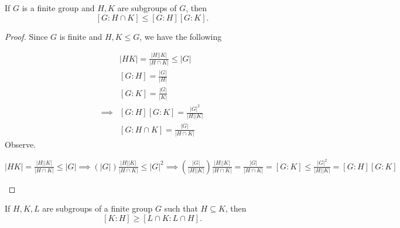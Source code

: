 \documentclass[addpoints,10pt]{exam}
\theoremstyle{plain}
\theoremstyle{definition}
\newtheorem{prob}[thm]{Problem}
\theoremstyle{plain}
\theoremstyle{plain}
\theoremstyle{definition}
\let\oldprob\prob
\let\endoldprob\endprob
\renewenvironment{prob}
  {\begin{singlespace}\oldprob}
  {\endoldprob\end{singlespace}}
\begin{document}
\begin{prob}
If $G$ is a finite group and $H,K$ are subgroups of $G$, then
\[
[G:H\cap K] \le [G:H][G:K].
\]
\end{prob}
\begin{proof}
Since $G$ is finite and $H,K\leq G$, we have the following

\begin{align}
&|HK|=\frac{|H||K|}{|H\cap K|}\leq |G|\\
&[G:H]=\frac{|G|}{|H|}\\
&[G:K]=\frac{|G|}{|K|}\\
\implies&[G:H][G:K]=\frac{|G|^{2}}{|H||K|}\\
&[G:H\cap K]=\frac{|G|}{|H\cap K|}
\end{align}
Observe.
\begin{center}
$|HK|=\frac{|H||K|}{|H\cap K|}\leq |G|\implies (|G|)\frac{|H||K|}{|H\cap K|}\leq |G|^{2}\implies (\frac{|G|}{|H||K|})\frac{|H||K|}{|H\cap K|}=\frac{|G|}{|H\cap K|}=[G:K]\leq \frac{|G|^{2}}{|H||K|}=[G:H][G:K]$
\end{center}
\end{proof}
\newpage

\begin{prob}
If $H,K,L$ are subgroups of a finite group $G$ such that $H\subseteq K$, then
\[
[K:H] \ge [L\cap K : L\cap H].
\]
\end{prob}
\end{document}
